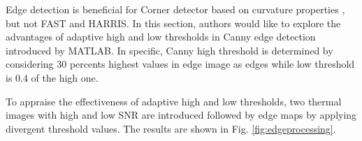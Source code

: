 
Edge detection is beneficial for Corner detector based on curvature properties \cite{Yung2008}, but not FAST and HARRIS. In this section, authors would like to explore the advantages of adaptive high and low thresholds in Canny edge detection introduced by MATLAB. In specific, Canny high threshold is determined by considering 30 percents highest values in edge image as edges while low threshold is 0.4 of the high one.


To appraise the effectiveness of adaptive high and low thresholds, two thermal images with high and low SNR are introduced followed by edge maps by applying divergent threshold values. The results are shown in Fig. \ref{fig:edgeprocessing}.


